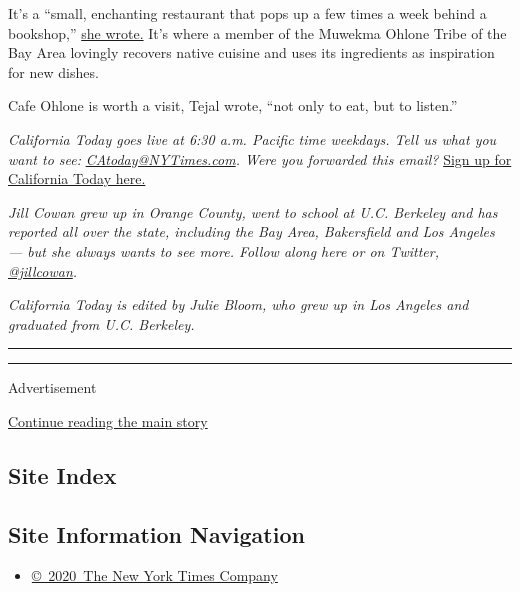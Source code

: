 It's a ``small, enchanting restaurant that pops up a few times a week
behind a bookshop,''
\href{https://www.nytimes3xbfgragh.onion/2019/08/12/dining/cafe-ohlone-review-berkeley.html}{she
wrote.} It's where a member of the Muwekma Ohlone Tribe of the Bay Area
lovingly recovers native cuisine and uses its ingredients as inspiration
for new dishes.

Cafe Ohlone is worth a visit, Tejal wrote, ``not only to eat, but to
listen.''

\emph{California Today goes live at 6:30 a.m. Pacific time weekdays.
Tell us what you want to see:}
\href{mailto:CAtoday@NYTimes.com}{\emph{CAtoday@NYTimes.com}}\emph{.
Were you forwarded this email?}
\href{https://www.nytimes3xbfgragh.onion/newsletters/california-today?module=inline}{Sign
up for California Today here.}

\emph{Jill Cowan grew up in Orange County, went to school at U.C.
Berkeley and has reported all over the state, including the Bay Area,
Bakersfield and Los Angeles --- but she always wants to see more. Follow
along here or on Twitter,}
\href{https://twitter.com/JillCowan}{\emph{@jillcowan}}\emph{.}

\emph{California Today is edited by Julie Bloom, who grew up in Los
Angeles and graduated from U.C. Berkeley.}

\begin{center}\rule{0.5\linewidth}{\linethickness}\end{center}

\begin{center}\rule{0.5\linewidth}{\linethickness}\end{center}

Advertisement

\protect\hyperlink{after-bottom}{Continue reading the main story}

\hypertarget{site-index}{%
\subsection{Site Index}\label{site-index}}

\hypertarget{site-information-navigation}{%
\subsection{Site Information
Navigation}\label{site-information-navigation}}

\begin{itemize}
\tightlist
\item
  \href{https://help.nytimes3xbfgragh.onion/hc/en-us/articles/115014792127-Copyright-notice}{©~2020~The
  New York Times Company}
\end{itemize}

